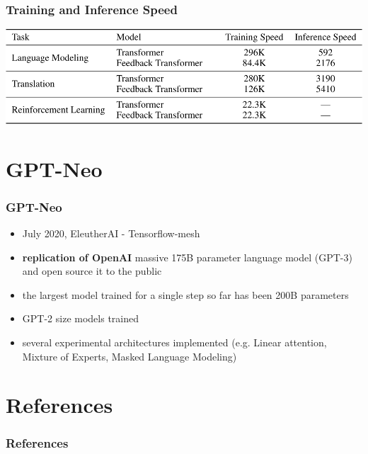 \documentclass{beamer}
\begin{document}
\begin{frame}
    \frametitle{Training and Inference Speed}
    \begin{center}
        \includegraphics[scale=0.34]{img/feedback_transformer_time.png}
    \end{center}
\end{frame}



\section{GPT-Neo}
\begin{frame}
    \frametitle{GPT-Neo}
    \begin{itemize}
        \item July 2020, EleutherAI - Tensorflow-mesh
        \item \textbf{replication of OpenAI} massive 175B parameter language model (GPT-3) and open source it to the public
        \item the largest model trained for a single step so far has been 200B parameters
        \item GPT-2 size models trained
        \item several experimental architectures implemented (e.g. Linear attention,  Mixture of Experts, Masked Language Modeling)
    \end{itemize}
\end{frame}

\section{References}
\begin{frame}[allowframebreaks,t]
    \tiny
    \frametitle{References}
    
    
\end{frame}
\end{document}
